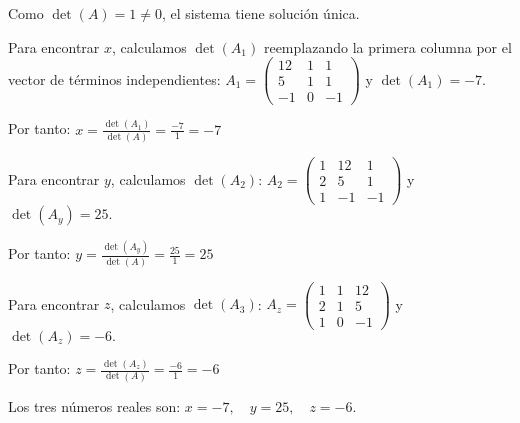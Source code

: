\begin{prob}
\begin{myproof}
Como $\det(A) = 1 \neq 0$, el sistema tiene solución única.

Para encontrar $x$, calculamos $\det(A_1)$ reemplazando la primera columna por el vector de términos independientes:
$A_1 = \begin{pmatrix}
12 & 1 & 1 \\
5 & 1 & 1 \\
-1 & 0 & -1
\end{pmatrix}$ y $\det(A_1) = -7.$

Por tanto: $x = \frac{\det(A_1)}{\det(A)} = \frac{-7}{1} = -7$

Para encontrar $y$, calculamos $\det(A_2)$: $A_2 = \begin{pmatrix}
1 & 12 & 1 \\
2 & 5 & 1 \\
1 & -1 & -1
\end{pmatrix}$ y $\det(A_y) = 25.$

Por tanto: $y = \frac{\det(A_y)}{\det(A)} = \frac{25}{1} = 25$

Para encontrar $z$, calculamos $\det(A_3)$:
$A_z = \begin{pmatrix}
1 & 1 & 12 \\
2 & 1 & 5 \\
1 & 0 & -1
\end{pmatrix}$ y $\det(A_z) = -6.$

Por tanto: $z = \frac{\det(A_z)}{\det(A)} = \frac{-6}{1} = -6$

Los tres números reales son: $x = -7, \quad y = 25, \quad z = -6.$
\end{myproof}
\end{prob}


